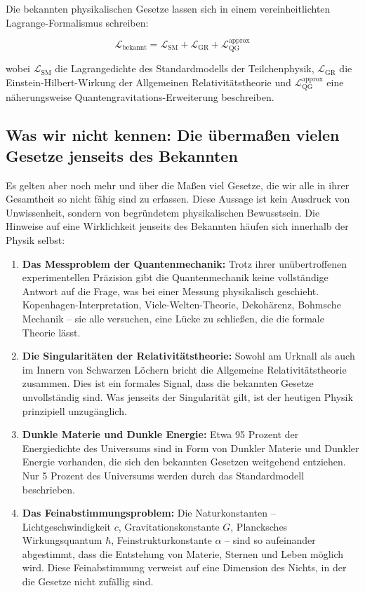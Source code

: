 ﻿\documentclass[12pt,a4paper]{report}
\begin{document}
Die bekannten physikalischen Gesetze lassen sich in einem vereinheitlichten Lagrange-Formalismus schreiben:

\begin{equation}
	\mathcal{L}_{\text{bekannt}} = \mathcal{L}_{\text{SM}} + \mathcal{L}_{\text{GR}} + \mathcal{L}_{\text{QG}}^{\text{approx}}
	\label{eq:lagrange_bekannt}
\end{equation}

wobei $\mathcal{L}_{\text{SM}}$ die Lagrangedichte des Standardmodells der Teilchenphysik, $\mathcal{L}_{\text{GR}}$ die Einstein-Hilbert-Wirkung der Allgemeinen Relativitätstheorie und $\mathcal{L}_{\text{QG}}^{\text{approx}}$ eine näherungs\-weise Quantengravitations-Erweiterung beschreiben.

\subsection{Was wir nicht kennen: Die übermaßen vielen Gesetze jenseits des Bekannten}

Es gelten aber noch mehr und über die Maßen viel Gesetze, die wir alle in ihrer Gesamtheit so nicht fähig sind zu erfassen. Diese Aussage ist kein Ausdruck von Unwissenheit, sondern von begründetem physikalischen Bewusstsein. Die Hinweise auf eine Wirklichkeit jenseits des Bekannten häufen sich innerhalb der Physik selbst:

\begin{enumerate}
	\item \textbf{Das Messproblem der Quantenmechanik:} Trotz ihrer unübertroffenen experimentellen Präzision gibt die Quantenmechanik keine vollständige Antwort auf die Frage, was bei einer Messung physikalisch geschieht. Kopenhagen-Interpretation, Viele-Welten-Theorie, Dekohärenz, Bohmsche Mechanik -- sie alle versuchen, eine Lücke zu schließen, die die formale Theorie lässt.

	\item \textbf{Die Singularitäten der Relativitätstheorie:} Sowohl am Urknall als auch im Innern von Schwarzen Löchern bricht die Allgemeine Relativitätstheorie zusammen. Dies ist ein formales Signal, dass die bekannten Gesetze unvollständig sind. Was jenseits der Singularität gilt, ist der heutigen Physik prinzipiell unzugänglich.

	\item \textbf{Dunkle Materie und Dunkle Energie:} Etwa 95 Prozent der Energiedichte des Universums sind in Form von Dunkler Materie und Dunkler Energie vorhanden, die sich den bekannten Gesetzen weitgehend entziehen. Nur 5 Prozent des Universums werden durch das Standardmodell beschrieben.

	\item \textbf{Das Feinabstimmungsproblem:} Die Naturkonstanten -- Lichtgeschwindigkeit $c$, Gravitationskonstante $G$, Plancksches Wirkungsquantum $\hbar$, Feinstrukturkonstante $\alpha$ -- sind so aufeinander abgestimmt, dass die Entstehung von Materie, Sternen und Leben möglich wird. Diese Feinabstimmung verweist auf eine Dimension des Nichts, in der die Gesetze nicht zufällig sind.
\end{enumerate}
\end{document}
